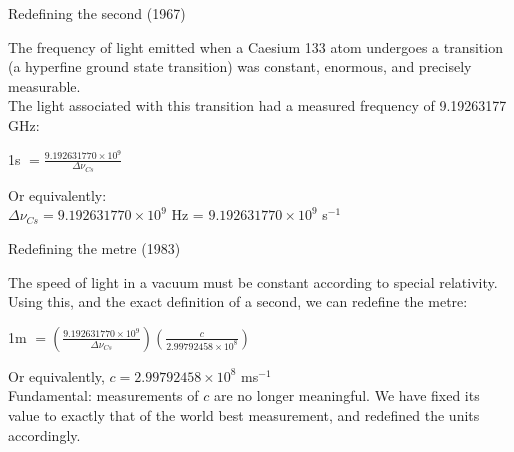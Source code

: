 \begin{frame}{Redefining the second  (1967)}
\small

The frequency of light emitted when a Caesium 133 atom undergoes a transition (a hyperfine ground state transition) was constant, enormous, and precisely measurable.\\[1ex]

The light associated with this transition had a measured frequency of 9.19263177 GHz:\\[6ex]

\begin{center}
1s $ = \displaystyle  \frac{9.192631770 \times 10^{9}}{\Delta \nu_{Cs}} $\\[3ex]
 \end{center}

 \vspace{0.5cm}
 

Or equivalently:\\[1ex]

 $\Delta \nu_{Cs} = 9.192631770 \times 10^{9}$ Hz = $9.192631770 \times 10^{9}$ s$^{-1}$\\[1ex]

\end{frame}



\begin{frame}{Redefining the metre (1983)}
\small

The speed of light in a vacuum must be constant according to special relativity. Using this, and the exact definition of a second, we can redefine the metre:\\[1ex]

\begin{center}
1m $ = \displaystyle \left( \frac{9.192631770 \times 10^{9}}{\Delta \nu_{Cs}}\right)  \left( \frac{c}{2.99792458 \times 10^{8}}\right)  $\\[2ex]
 \end{center}
 \vspace{0.5cm}
 
Or equivalently, $c = 2.99792458 \times 10^{8}$ ms$^{-1}$\\[1ex]


Fundamental: measurements of $c$ are no longer meaningful. We have fixed its value to exactly that of the world best measurement, and redefined the units accordingly.\\[1ex]

\end{frame}


